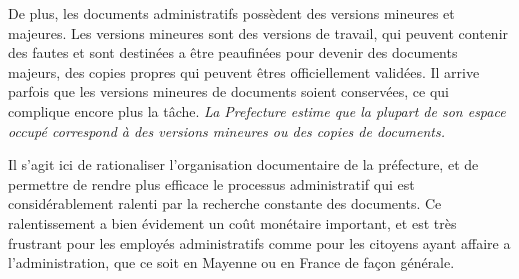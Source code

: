 De plus, les documents administratifs possèdent des versions mineures et majeures.
Les versions mineures sont des versions de travail, qui peuvent contenir des fautes et sont destinées a être peaufinées pour devenir des documents majeurs, des copies propres qui peuvent êtres officiellement validées.
Il arrive parfois que les versions mineures de documents soient conservées, ce qui complique encore plus la tâche.
\emph{La Prefecture estime que la plupart de son espace occupé correspond à des versions mineures ou des copies de documents.}

Il s'agit ici de rationaliser l'organisation documentaire de la préfecture, et de permettre de rendre plus efficace le processus administratif qui est considérablement ralenti par la recherche constante des documents.
Ce ralentissement a bien évidement un coût monétaire important, et est très frustrant pour les employés administratifs comme pour les citoyens ayant affaire a l'administration, que ce soit en Mayenne ou en France de façon générale. 

